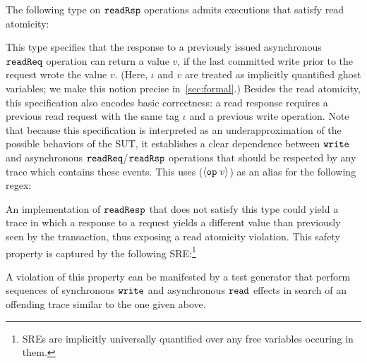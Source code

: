   The following \tyName{} type on $\boldsymbol{{\tt readRsp}}$
  operations admits executions that satisfy read atomicity:
  \vspace{-.4cm} \par{}\vspace{-.5cm} \par\nobreak\noindent
This type specifies that the response to a previously issued
asynchronous $\boldsymbol{{\tt readReq}}$ operation can return a value $v$, if the
last committed write prior to the request wrote the value $v$. (Here,
$\iota$ and $v$ are treated as implicitly quantified ghost variables;
we make this notion precise in~\autoref{sec:formal}.) 
%
  Besides the read atomicity, this specification also encodes basic correctness: a read response requires a
    previous read request with the same tag $\iota$ and a previous write
    operation.
Note that
because this specification is
interpreted as an underapproximation of the possible behaviors of the
SUT, it establishes a clear dependence between $\boldsymbol{{\tt write}}$
and asynchronous $\boldsymbol{{\tt readReq}}$/$\boldsymbol{{\tt readRsp}}$ operations that should be respected by any
trace which contains these events.  This \tyName{} uses
(${\langle} {\boldsymbol{{\tt op}}\;{v}} {\rangle}$) as an alias for the following regex:
\vspace{-.4cm} \par{}\vspace{-.5cm} \par\nobreak\noindent %
An implementation of $\boldsymbol{{\tt readResp}}$ that does not satisfy this type
could yield a trace in which a response to a request yields a
different value than previously seen by the transaction, thus exposing
a read atomicity violation.  This safety property is captured by the
following SRE:\footnote{SREs are implicitly universally quantified
  over any free variables occuring in them.}%
\vspace{-.4cm} \par{}
\vspace{-.5cm} \par\nobreak\noindent
A violation of this property can be manifested by a test
generator that perform sequences of synchronous $\boldsymbol{{\tt write}}$ and
asynchronous $\boldsymbol{{\tt read}}$ effects in search of an offending trace
similar to the one given above.

